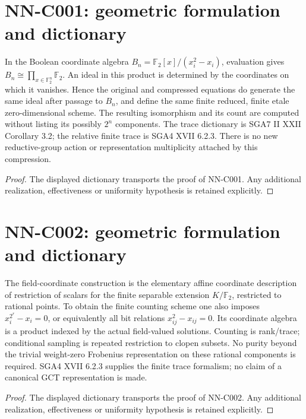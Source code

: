 \section{NN-C001: geometric formulation and dictionary}
\begin{geometricstatement}[NN-C001]
In the Boolean coordinate algebra $B_n=\mathbb F_2[x]/(x_i^2-x_i)$, evaluation gives $B_n\cong\prod_{x\in\mathbb F_2^n}\mathbb F_2$. An ideal in this product is determined by the coordinates on which it vanishes. Hence the original and compressed equations do generate the same ideal after passage to $B_n$, and define the same finite reduced, finite etale zero-dimensional scheme. The resulting isomorphism and its count are computed without listing its possibly $2^n$ components. The trace dictionary is SGA7 II XXII Corollary 3.2; the relative finite trace is SGA4 XVII 6.2.3. There is no new reductive-group action or representation multiplicity attached by this compression.
\end{geometricstatement}
\begin{proof} The displayed dictionary transports the proof of NN-C001. Any additional realization, effectiveness or uniformity hypothesis is retained explicitly.\end{proof}


\section{NN-C002: geometric formulation and dictionary}
\begin{geometricstatement}[NN-C002]
The field-coordinate construction is the elementary affine coordinate description of restriction of scalars for the finite separable extension $K/\mathbb F_2$, restricted to rational points. To obtain the finite counting scheme one also imposes $x_i^{2^r}-x_i=0$, or equivalently all bit relations $x_{ij}^2-x_{ij}=0$. Its coordinate algebra is a product indexed by the actual field-valued solutions. Counting is rank/trace; conditional sampling is repeated restriction to clopen subsets. No purity beyond the trivial weight-zero Frobenius representation on these rational components is required. SGA4 XVII 6.2.3 supplies the finite trace formalism; no claim of a canonical GCT representation is made.
\end{geometricstatement}
\begin{proof} The displayed dictionary transports the proof of NN-C002. Any additional realization, effectiveness or uniformity hypothesis is retained explicitly.\end{proof}


